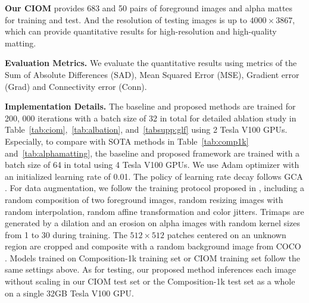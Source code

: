 \documentclass[10pt,twocolumn,letterpaper]{article}
\begin{document}
\textbf{Our CIOM} provides 683 and 50 pairs of foreground images and alpha mattes for training and test. And the resolution of testing images is up to $4000\times 3867$, which can provide quantitative results for high-resolution and high-quality matting.

\textbf{Evaluation Metrics.}  We evaluate the quantitative results using metrics of the Sum of Absolute Differences (SAD),
Mean Squared Error (MSE), Gradient error (Grad) and Connectivity error (Conn).

\textbf{Implementation Details.} The baseline and proposed methods are trained for 200, 000 iterations with a batch size of 32 in total for detailed ablation study in Table~\ref{tab:ciom},~\ref{tab:albation}, and~\ref{tabsupp:glf} using 2 Tesla V100 GPUs. Especially, to compare with  SOTA methods in Table~\ref{tab:comp1k} and~\ref{tab:alphamatting}, the baseline and proposed framework are trained with a batch size of 64 in total using 4 Tesla V100 GPUs. We use Adam  optimizer \cite{adam} with an  initialized  learning rate of 0.01. The policy of learning rate decay follows GCA \cite{gca}. For data augmentation, we follow the training protocol
proposed in \cite{gca,hop}, including a random composition of two foreground images, random resizing images with random interpolation, random affine transformation and color jitters. Trimaps are generated by a dilation and an erosion on alpha images with random kernel sizes from 1 to 30 during training. The $512\times 512$ patches centered on an unknown region are cropped and  composite with a
random background image from COCO \cite{coco}. Models trained on Composition-1k \cite{deepmatting} training set or CIOM training set follow the same settings above.  As for testing, our proposed method  inferences each image without scaling in  our CIOM test set or the Composition-1k \cite{deepmatting} test set  as a whole on a single 32GB Tesla V100 GPU.
\end{document}

